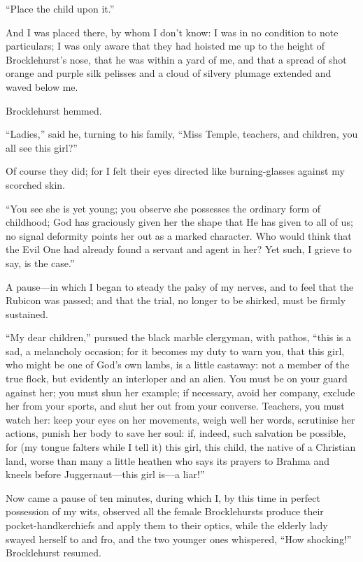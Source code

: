 \enquote{Place the child upon it.}

And I was placed there, by whom I don't know: I was in no condition to
note particulars; I was only aware that they had hoisted me up to the
height of \Mr{} Brocklehurst's nose, that he was within a yard of me, and
that a spread of shot orange and purple silk pelisses and a cloud of
silvery plumage extended and waved below me.

\Mr{} Brocklehurst hemmed.

\enquote{Ladies,} said he, turning to his family, \enquote{Miss Temple,
	teachers, and children, you all see this girl?}

Of course they did; for I felt their eyes directed like burning-glasses
against my scorched skin.

\enquote{You see she is yet young; you observe she possesses the
	ordinary form of childhood; God has graciously given her the shape that
	He has given to all of us; no signal deformity points her out as a
	marked character. Who would think that the Evil One had already found a
	servant and agent in her? Yet such, I grieve to say, is the case.}

A pause---in which I began to steady the palsy of my nerves, and to feel
that the Rubicon was passed; and that the trial, no longer to be
shirked, must be firmly sustained.

\enquote{My dear children,} pursued the black marble clergyman, with
pathos, \enquote{this is a sad, a melancholy occasion; for it becomes my
	duty to warn you, that this girl, who might be one of God's own lambs,
	is a little castaway: not a member of the true flock, but evidently an
	interloper and an alien. You must be on your guard against her; you
	must shun her example; if necessary, avoid her company, exclude her from
	your sports, and shut her out from your converse. Teachers, you must
	watch her: keep your eyes on her movements, weigh well her words,
	scrutinise her actions, punish her body to save her soul: if, indeed,
	such salvation be possible, for (my tongue falters while I tell it) this
	girl, this child, the native of a Christian land, worse than many a
	little heathen who says its prayers to Brahma and kneels before
	Juggernaut---this girl is---a liar!}

Now came a pause of ten minutes, during which I, by this time in perfect
possession of my wits, observed all the female Brocklehursts produce
their pocket-handkerchiefs and apply them to their optics, while the
elderly lady swayed herself to and fro, and the two younger ones
whispered, \enquote{How shocking!} \Mr{} Brocklehurst resumed.

